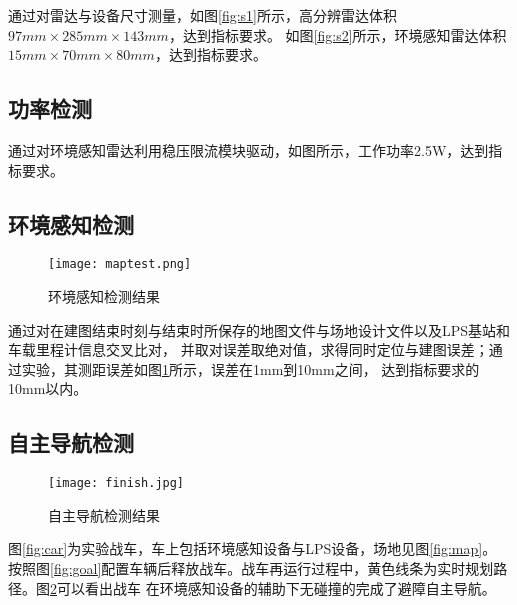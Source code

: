 \documentclass[lang=cn,11pt,a4paper]{elegantpaper}
\begin{document}
通过对雷达与设备尺寸测量，如图\ref{fig:s1}所示，高分辨雷达体积$97mm \times 285mm \times 143mm$，达到指标要求。
如图\ref{fig:s2}所示，环境感知雷达体积$15mm \times 70mm \times 80mm$，达到指标要求。

\subsection{功率检测}
通过对环境感知雷达利用稳压限流模块驱动，如图所示，工作功率2.5W，达到指标要求。

\subsection{环境感知检测}
\begin{figure}[htbp]
  \centering
  \texttt{[image: maptest.png]}
  \caption{环境感知检测结果}
  \label{fig:maptest}
\end{figure}
通过对在建图结束时刻与结束时所保存的地图文件与场地设计文件以及LPS基站和车载里程计信息交叉比对，
并取对误差取绝对值，求得同时定位与建图误差；通过实验，其测距误差如图\ref{fig:maptest}所示，误差在1mm到10mm之间，
达到指标要求的10mm以内。

\subsection{自主导航检测}

\begin{figure}[htbp]
  \centering
  \texttt{[image: finish.jpg]}
  \caption{自主导航检测结果}
  \label{fig:navtest}
\end{figure}

图\ref{fig:car}为实验战车，车上包括环境感知设备与LPS设备，场地见图\ref{fig:map}。
按照图\ref{fig:goal}配置车辆后释放战车。战车再运行过程中，黄色线条为实时规划路径。图\ref{fig:navtest}可以看出战车
在环境感知设备的辅助下无碰撞的完成了避障自主导航。



\end{document}
